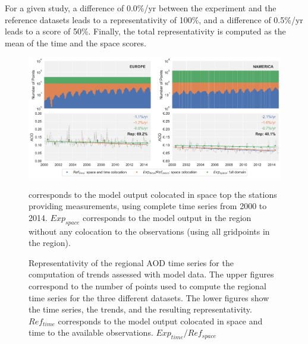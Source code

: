 \documentclass[journal abbreviation, manuscript]{copernicus}
\begin{document}
For a given study, a difference of 0.0\%/yr between the experiment and the reference datasets leads to a representativity of 100\%, and a difference of 0.5\%/yr leads to a score of 50\%. Finally, the total representativity is computed as the mean of the time and the space scores.

\begin{figure}[t]
 \includegraphics[width=16cm]{../scripts/figs/representativity-od550aer.png}
 \caption{Representativity of the regional AOD time series for the computation of trends assessed with model data. The upper figures correspond to the number of points used to compute the regional time series for the three different datasets. The lower figures show the time series, the trends, and the resulting representativity. $Ref_{time}$ corresponds to the model output colocated in space and time to the available observations. $Exp_{time}/Ref_{space}$} corresponds to the model output colocated in space top the stations providing measurements, using complete time series from 2000 to 2014. $Exp_{space}$ corresponds to the model output in the region without any colocation to the observations (using all gridpoints in the region).
 \label{fig:representativity}
\end{figure}
\end{document}
